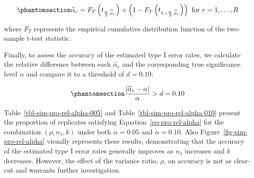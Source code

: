 \documentclass[
  12pt]{article}
\begin{document}
\begin{equation}\phantomsection\label{eq-type-I-error-rates}{\widehat{\alpha}_r = F_{T}\left(t_{\frac{\alpha}{2},\widehat{\nu}_r}\right) + \left(1 - F_{T}\left(t_{1-\frac{\alpha}{2},\widehat{\nu}_r}\right)\right) \text{ for } r = 1, \ldots, R}\end{equation}

where \(F_T\) represents the empirical cumulative distribution function
of the two-sample t-test statistic.

Finally, to assess the accuracy of the estimated type I error rates, we
calculate the relative difference between each \(\widehat{\alpha}_r\)
and the corresponding true significance level \(\alpha\) and compare it
to a threshold of \(d=0.10\):

\begin{equation}\phantomsection\label{eq-pro-rel-alpha}{\frac{|\widehat{\alpha}_r - \alpha|}{\alpha} > d = 0.10}\end{equation}

Table~\ref{tbl-sim-pro-rel-alpha-005} and
Table~\ref{tbl-sim-pro-rel-alpha-010} present the proportion of
replicates satisfying Equation~\ref{eq-pro-rel-alpha} for the
combination \((\rho, n_1, k)\) under both \(\alpha = 0.05\) and
\(\alpha = 0.10\). Also Figure~\ref{fig-sim-pro-rel-alpha} visually
represents these results, demonstrating that the accuracy of the
estimated type I error rates generally improves as \(n_1\) increases and
\(k\) decreases. However, the effect of the variance ratio, \(\rho\), on
accuracy is not as clear-cut and warrants further investigation.

\begingroup\fontsize{7}{9}\selectfont
\end{document}

